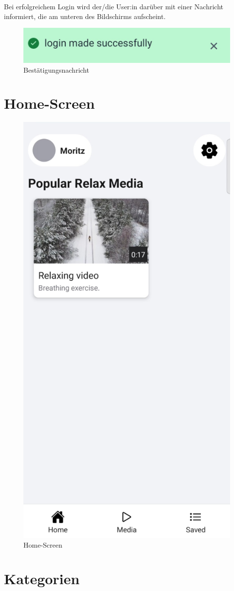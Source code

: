 Bei erfolgreichem Login wird der/die User:in darüber mit einer Nachricht informiert, die am unteren des Bildschirms 
aufscheint.

\begin{figure}[H]
    \centering
    \includegraphics[height=0.09\textwidth]{./pics/message_cut.jpg}
    \caption{Bestätigungsnachricht}
\end{figure}

\section{Home-Screen}

\begin{figure}[H]
    \centering
    \includegraphics[height=\textwidth]{./pics/Home.jpg}
    \caption{Home-Screen}
\end{figure}

\section{Kategorien}

